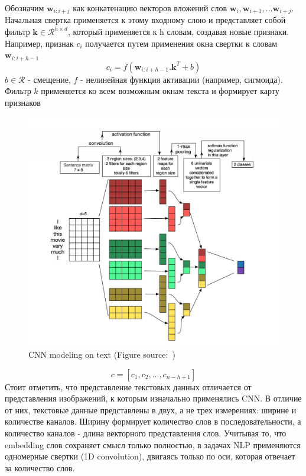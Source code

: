 Обозначим ${\mathbf w_{i:i+j}} $ как конкатенацию векторов
 вложений слов ${\mathbf w_{i}}, {\mathbf w_{i+1}}, ... {\mathbf w_{i+j}}$. Начальная свертка применяется к этому входному слою и представляет собой фильтр ${\mathbf k} \in \mathcal{R}^{h \times d}$, который применяется к h словам, создавая новые признаки. Например, признак $c_i$ получается путем применения окна свертки к словам ${\mathbf w_{i:i+h-1}} $
\begin{equation}
c_i = f({\mathbf w_{i:i+h-1}}.{\mathbf k}^T + b )
\end{equation} 
 $b \in \mathcal{R}$ - смещение, $f$ - нелинейная функция активации (например, сигмоида). Фильтр $k$ применяется ко всем возможным окнам текста и формирует карту признаков
\begin{figure}[t]
	\includegraphics[scale=0.3]{img/CNN}
	\centering
	\caption{CNN modeling on text (Figure source:~\autocite{zhang2015sensitivity})}\label{fig:CNN}
\end{figure}
\begin{equation}
c = [c_1, c_2, ... , c_{n-h+1}]
\end{equation} 
Стоит отметить, что представление текстовых данных отличается от представления изображений, к которым изначально применялись CNN. В отличие от них, текстовые данные представлены в двух, а не трех измерениях: ширине и количестве каналов. Ширину формирует количество слов в последовательности, а количество каналов - длина векторного представления слов. Учитывая то, что embedding слов сохраняет смысл только полностью, в задачах NLP применяются одномерные свертки (1D convolution), двигаясь только по оси, которая отвечает за количество слов.

